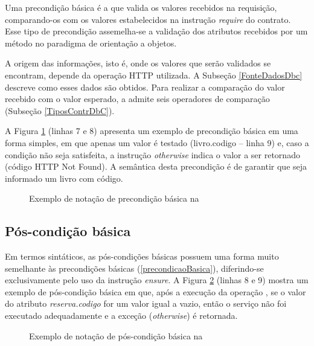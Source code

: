 Uma precondição básica é a que valida os valores recebidos na
requisição, comparando-os com os valores estabelecidos na instrução
\emph{require} do contrato. Esse tipo de precondição assemelha-se a validação
dos atributos recebidos por um método no paradigma de orientação a objetos.

A origem das informações, isto é, onde os valores que serão validados se
encontram, depende da operação HTTP utilizada. A Subseção \ref{FonteDadosDbc} descreve como esses
dados são obtidos. Para realizar a comparação do valor recebido com o valor
esperado, a \neoidl{} admite seis operadores de comparação (Subseção
\ref{TiposContrDbC}).

A Figura \ref{lst:DBCPreCondBasica} (linhas 7 e 8) apresenta um exemplo de
precondição básica em uma forma simples, em que apenas um valor é testado
(livro.codigo -- linha 9) e, caso a condição não seja satisfeita, a instrução
\emph{otherwise} indica o valor a ser retornado (código HTTP Not Found). A
semântica desta precondição é de garantir que seja informado um livro com
código.

\begin{figure}[htb]
\begin{small}

\end{small}
\caption{Exemplo de notação de precondição básica na \neoidl{}}
\label{lst:DBCPreCondBasica}
\end{figure} 



\subsection{Pós-condição básica}

Em termos sintáticos, as pós-condições básicas possuem uma forma muito
semelhante às precondições básicas (\ref{precondicaoBasica}), diferindo-se
exclusivamente pelo uso da instrução \emph{ensure}. A Figura
\ref{lst:DBCPosCondBasica} (linhas 8 e 9) mostra um exemplo de pós-condição
básica em que, após a execução da operação , se o valor do atributo
\emph{reserva.codigo} for um valor igual a vazio, então o serviço não
foi executado adequadamente e a exceção (\emph{otherwise}) é retornada.

\begin{figure}[htb]
\begin{small}

\end{small}
\caption{Exemplo de notação de pós-condição básica na \neoidl{}}
\label{lst:DBCPosCondBasica}
\end{figure} 


